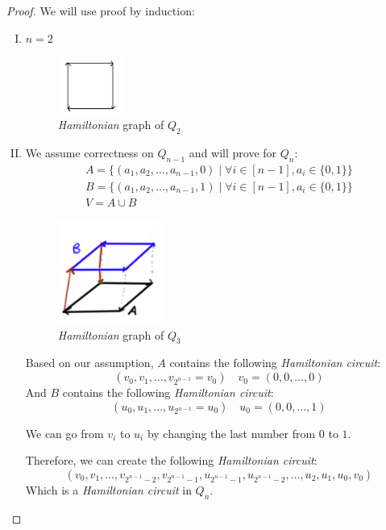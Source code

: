 \documentclass[00_complete]{subfiles}
\begin{document}
\begin{proof}
    We will use proof by induction:
    \begin{enumerate}[I.]
        \item $n=2$
    \begin{figure}[ht]
        \centering
        \includegraphics[width=0.2\textwidth]{w12_q2}
        \caption{\emph{Hamiltonian} graph of $Q_2$}
    \end{figure}
        \item We assume correctness on $Q_{n-1}$ and will prove for $Q_n$:
    \begin{gather*}
        A=\{(a_1,a_2,\dots, a_{n-1},0) \mid \forall i \in [n-1], a_i \in\{0,1\}\} \\
        B=\{(a_1,a_2,\dots, a_{n-1},1) \mid \forall i \in [n-1], a_i \in\{0,1\}\} \\
        V=A \cup B
    \end{gather*}
        \begin{figure}[ht]
        \centering
        \includegraphics[width=0.33\textwidth]{w12_q3}
        \caption{\emph{Hamiltonian} graph of $Q_3$}
    \end{figure}
    Based on our assumption, $A$ contains the following \emph{Hamiltonian
    circuit}:
    $$(v_0,v_1,\dots,v_{2^{n-1}}=v_0) \quad v_0=(0,0,\dots,0)$$
    And $B$ contains the following \emph{Hamiltonian circuit}:
    $$(u_0,u_1,\dots,u_{2^{n-1}}=u_0) \quad u_0=(0,0,\dots,1)$$
    \begin{note}
        We can go from $v_i$ to $u_i$ by changing the last number from $0$ to $1$.
    \end{note}
    Therefore, we can create the following \emph{Hamiltonian circuit}:
    $$(v_0,v_1,\dots,v_{2^{n-1}-2},v_{2^{n-1}-1},u_{2^{n-1}-1},u_{2^{n-1}-2},\dots,u_2,u_1,u_0,v_0)$$
    Which is a \emph{Hamiltonian circuit} in $Q_n$.
    \end{enumerate}
\end{proof}
\end{document}
